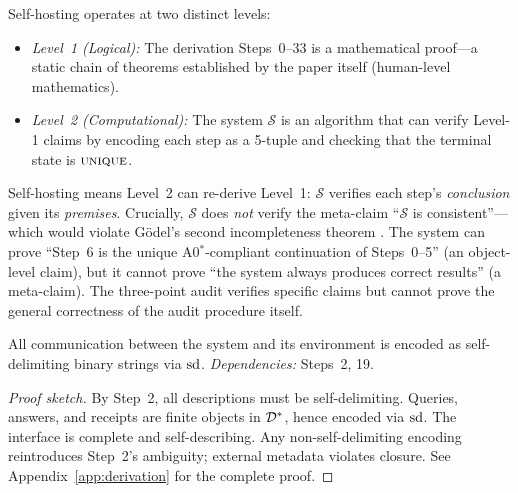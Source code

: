 \begin{remark}
\label{rem:self-hosting-godel}
Self-hosting operates at two distinct levels:
\begin{itemize}[nosep]
  \item \emph{Level~1 (Logical):} The derivation Steps~0--33 is a
        mathematical proof---a static chain of theorems established by
        the paper itself (human-level mathematics).
  \item \emph{Level~2 (Computational):} The system $\mathcal{S}$ is an
        algorithm that can verify Level-1 claims by encoding each step as
        a 5-tuple and checking that the terminal state is $\textsc{unique}$.
\end{itemize}
Self-hosting means Level~2 can re-derive Level~1: $\mathcal{S}$ verifies
each step's \emph{conclusion} given its \emph{premises}.  Crucially,
$\mathcal{S}$ does \emph{not} verify the meta-claim ``$\mathcal{S}$ is
consistent''---which would violate G\"{o}del's second incompleteness
theorem \citep{godel1931}.  The system can prove ``Step~6 is the unique A0$^*$-compliant
continuation of Steps~0--5'' (an object-level claim), but it cannot prove
``the system always produces correct results'' (a meta-claim).  The
three-point audit verifies specific claims but cannot prove the general
correctness of the audit procedure itself.
\end{remark}

\begin{theorem}
\label{thm:binary-interface}
All communication between the system and its environment is encoded as self-delimiting binary strings via $\mathrm{sd}$.
\emph{Dependencies:} Steps~2, 19.
\begin{proof}[Proof sketch]
By Step~2, all descriptions must be self-delimiting.  Queries, answers, and receipts are finite objects in $\mathcal{D}^*$, hence encoded via $\mathrm{sd}$.  The interface is complete and self-describing.  Any non-self-delimiting encoding reintroduces Step~2's ambiguity; external metadata violates closure.
See Appendix~\ref{app:derivation} for the complete proof.
\end{proof}
\end{theorem}

